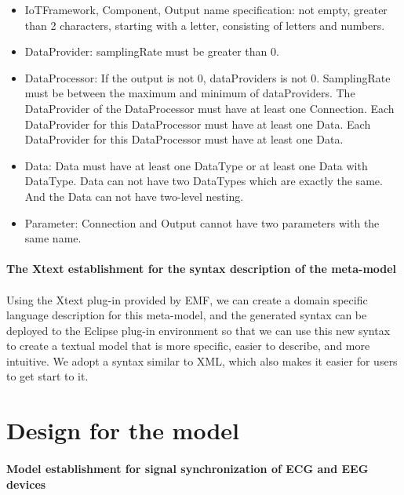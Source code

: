 \documentclass{article}
\begin{document}
\begin{itemize}

    \item IoTFramework, Component, Output name specification: not empty, greater than 2 characters, starting with a letter, consisting of letters and numbers.
    \item DataProvider: samplingRate must be greater than 0.
    \item DataProcessor: If the output is not 0, dataProviders is not 0. SamplingRate must be between the maximum and minimum of dataProviders. The DataProvider of the DataProcessor must have at least one Connection. Each DataProvider for this DataProcessor must have at least one Data. Each DataProvider for this DataProcessor must have at least one Data.
    \item Data: Data must have at least one DataType or at least one Data with DataType. Data can not have two DataTypes which are exactly the same. And the Data can not have two-level nesting.
    \item Parameter: Connection and Output cannot have two parameters with the same name.

\end{itemize}

\paragraph{The Xtext establishment for the syntax description of the meta-model} 

\paragraph{}

Using the Xtext plug-in provided by EMF, we can create a domain specific language description for this meta-model, and the generated syntax can be deployed to the Eclipse plug-in environment so that we can use this new syntax to create a textual model that is more specific, easier to describe, and more intuitive. We adopt a syntax similar to XML, which also makes it easier for users to get start to it.

\section{Design for the model}

\paragraph{Model establishment for signal synchronization of ECG and EEG devices} 
\end{document}
